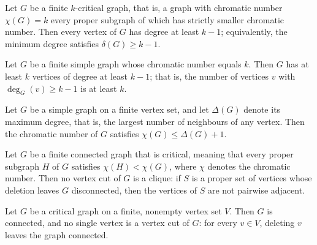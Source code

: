 \begin{theorem}
\label{SimpleGraph.IsKCritical.minDegree_ge}
\leanok
{}
Let $G$ be a finite $k$-critical graph, that is, a graph with chromatic number $\chi(G)
= k$ every proper subgraph of which has strictly smaller chromatic number. Then every
vertex of $G$ has degree at least $k - 1$; equivalently, the minimum degree satisfies
$\delta(G) \ge k - 1$.
\end{theorem}

\begin{theorem}
\label{SimpleGraph.card_filter_degree_ge_of_chromaticNumber}
\leanok
Let $G$ be a finite simple graph whose chromatic number equals $k$. Then $G$ has at
least $k$ vertices of degree at least $k-1$; that is, the number of vertices $v$ with
$\deg_G(v) \ge k-1$ is at least $k$.
\end{theorem}

\begin{theorem}
\label{SimpleGraph.chromaticNumber_le_maxDegree_add_one}
\leanok
Let $G$ be a simple graph on a finite vertex set, and let $\Delta(G)$ denote its maximum
degree, that is, the largest number of neighbours of any vertex. Then the chromatic
number of $G$ satisfies $\chi(G) \le \Delta(G) + 1$.
\end{theorem}

\begin{theorem}
\label{SimpleGraph.IsCritical.not_isClique_of_isVertexCut}
\leanok
{}
Let $G$ be a finite connected graph that is critical, meaning that every proper subgraph
$H$ of $G$ satisfies $\chi(H) < \chi(G)$, where $\chi$ denotes the chromatic number.
Then no vertex cut of $G$ is a clique: if $S$ is a proper set of vertices whose deletion
leaves $G$ disconnected, then the vertices of $S$ are not pairwise adjacent.
\end{theorem}

\begin{theorem}
\label{SimpleGraph.IsCritical.connected_and_no_cut_vertex}
\leanok
{}
Let $G$ be a critical graph on a finite, nonempty vertex set $V$. Then $G$ is connected,
and no single vertex is a vertex cut of $G$: for every $v \in V$, deleting $v$ leaves
the graph connected.
\end{theorem}

